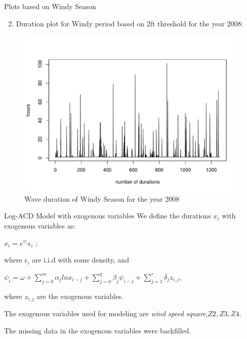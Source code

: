\documentclass[
  ignorenonframetext,
]{beamer}
\providecommand{\tightlist}{%
  \setlength{\itemsep}{0pt}\setlength{\parskip}{0pt}}
\begin{document}
\begin{frame}{Plots based on Windy Season}
\protect\hypertarget{plots-based-on-windy-season}{}
\begin{enumerate}
[1)]
\setcounter{enumi}{1}
\tightlist
\item
  Duration plot for Windy period based on 2ft threshold for the year
  2008:
\end{enumerate}

\begin{figure}
\includegraphics[width=1\linewidth]{Picture2} \caption{Wave duration of Windy Season for the year 2008}\label{fig:Windy Season}
\end{figure}
\end{frame}

\begin{frame}{Log-ACD Model with exogenous variables}
\protect\hypertarget{log-acd-model-with-exogenous-variables}{}
We define the durations \(x_i\) with exogenous variables as:

\(x_i = e^{\psi_i} \epsilon_i\) ;

where \(\epsilon_i\) are i.i.d with some density, and

\(\psi_i = \omega + \sum_{j=0}^m \alpha_j ln x_{i-j} + \sum_{j=0}^q \beta_j \psi_{i-j}+\sum_{j=1}^r\delta_jz_{i,j}\),

where \(z_{i,j}\) are the exogenous variables.

The exogenous variables used for modeling are
\textit{wind speed square},\(Z2, Z3, Z4\).

The missing data in the exogenous variables were backfilled.
\end{frame}
\end{document}
